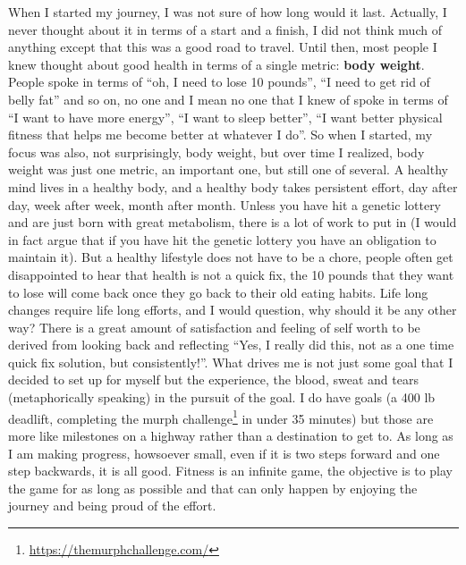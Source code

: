 \documentclass[
  oneside]{book}
\DeclareRobustCommand{\href}[2]{#2\footnote{\url{#1}}}
\begin{document}
When I started my journey, I was not sure of how long would it last. Actually, I never thought about it in terms of a start and a finish, I did not think much of anything except that this was a good road to travel. Until then, most people I knew thought about good health in terms of a single metric: \textbf{body weight}. People spoke in terms of ``oh, I need to lose 10 pounds'', ``I need to get rid of belly fat'' and so on, no one and I mean no one that I knew of spoke in terms of ``I want to have more energy'', ``I want to sleep better'', ``I want better physical fitness that helps me become better at whatever I do''. So when I started, my focus was also, not surprisingly, body weight, but over time I realized, body weight was just one metric, an important one, but still one of several. A healthy mind lives in a healthy body, and a healthy body takes persistent effort, day after day, week after week, month after month. Unless you have hit a genetic lottery and are just born with great metabolism, there is a lot of work to put in (I would in fact argue that if you have hit the genetic lottery you have an obligation to maintain it). But a healthy lifestyle does not have to be a chore, people often get disappointed to hear that health is not a quick fix, the 10 pounds that they want to lose will come back once they go back to their old eating habits. Life long changes require life long efforts, and I would question, why should it be any other way? There is a great amount of satisfaction and feeling of self worth to be derived from looking back and reflecting ``Yes, I really did this, not as a one time quick fix solution, but consistently!''. What drives me is not just some goal that I decided to set up for myself but the experience, the blood, sweat and tears (metaphorically speaking) in the pursuit of the goal. I do have goals (a 400 lb deadlift, completing the \href{https://themurphchallenge.com/}{murph challenge} in under 35 minutes) but those are more like milestones on a highway rather than a destination to get to. As long as I am making progress, howsoever small, even if it is two steps forward and one step backwards, it is all good. Fitness is an infinite game, the objective is to play the game for as long as possible and that can only happen by enjoying the journey and being proud of the effort.
\end{document}
